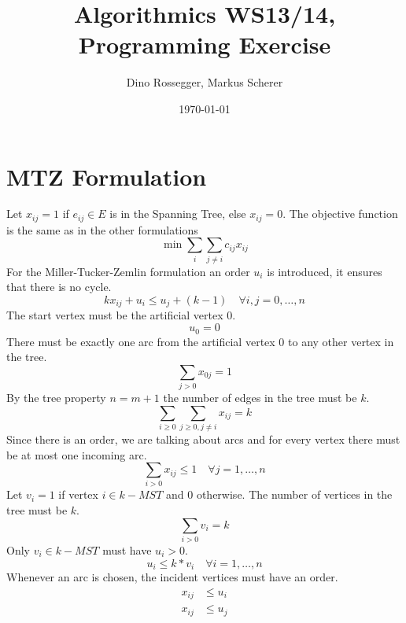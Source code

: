 \documentclass[a4paper]{article}
\title{Algorithmics WS13/14, Programming Exercise}
\author{Dino Rossegger, Markus Scherer}
\date{\today}
\begin{document}
\maketitle
\section{MTZ Formulation}
Let $x_{ij}=1$ if $e_{ij}\in E$ is in the Spanning Tree, else $x_{ij}=0$. The objective function is the same as in the other formulations
\begin{equation}
	\min{\sum_i \sum_{j\not=i} c_{ij}x_{ij}}
\end{equation}
For the Miller-Tucker-Zemlin formulation an order $u_i$ is introduced, it ensures that there is no cycle.
\begin{equation}
	kx_{ij} + u_i \leq u_j + (k-1) \quad \forall i,j=0,\dots,n
\end{equation}
The start vertex must be the artificial vertex $0$.
\begin{equation}
	u_0=0
\end{equation}
There must be exactly one arc from the artificial vertex $0$ to any other vertex in the tree.
\begin{equation}
	\sum_{j>0} x_{0j} = 1
\end{equation}
By the tree property $n=m+1$ the number of edges in the tree must be $k$.
\begin{equation}
	\sum_{i\geq0} \sum_{j\geq0,j\not =i} x_{ij} = k
\end{equation}
Since there is an order, we are talking about arcs and for every vertex there must be at most one incoming arc.
\begin{equation}
	\sum_{i>0} x_{ij}\leq 1 \quad \forall j=1,\dots,n
\end{equation}
Let $v_i=1$ if vertex $i \in k-MST$ and $0$ otherwise.
The number of vertices in the tree must be $k$.
\begin{equation}
	\sum_{i>0}v_i=k
\end{equation}
Only $v_i \in k-MST$ must have $u_i>0$.
\begin{equation}
	u_i \leq k*v_i	\quad \forall i=1,\dots,n
\end{equation}
Whenever an arc is chosen, the incident vertices must have an order.
\begin{align}
	x_{ij} &\leq u_i \\
	x_{ij} &\leq u_j 
\end{align}
\end{document}
